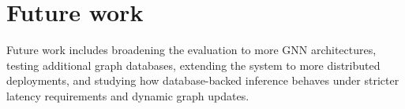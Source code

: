 \documentclass[PhD]{uclathes}
\begin{document}
\section{Future work}
Future work includes broadening the evaluation to more GNN architectures,
testing additional graph databases, extending the system to more distributed
deployments, and studying how database-backed inference behaves under stricter
latency requirements and dynamic graph updates.


% 
% 
\end{document}
